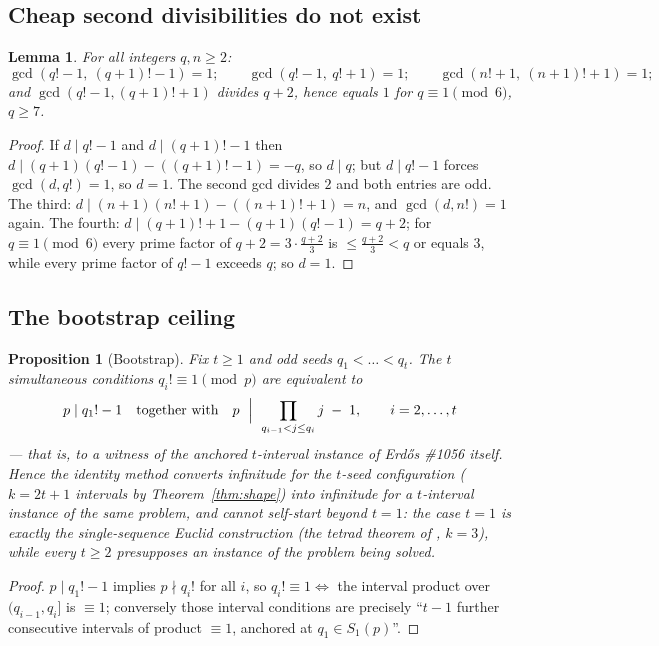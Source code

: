 \documentclass[11pt]{article}
\newtheorem{lemma}[theorem]{Lemma}
\newtheorem{proposition}[theorem]{Proposition}
\theoremstyle{definition}
\theoremstyle{remark}
\begin{document}
\subsection{Cheap second divisibilities do not exist}

\begin{lemma}\label{lem:gcds}
For all integers $q, n \ge 2$:
\[
  \gcd(q!-1,\ (q+1)!-1) = 1; \qquad
  \gcd(q!-1,\ q!+1) = 1; \qquad
  \gcd(n!+1,\ (n+1)!+1) = 1;
\]
and $\gcd(q!-1, (q+1)!+1)$ divides $q+2$, hence equals $1$ for
$q \equiv 1 \pmod 6$, $q \ge 7$.
\end{lemma}

\begin{proof}
If $d \mid q!-1$ and $d \mid (q+1)!-1$ then
$d \mid (q+1)(q!-1) - ((q+1)!-1) = -q$, so $d \mid q$; but $d \mid q!-1$
forces $\gcd(d, q!) = 1$, so $d = 1$. The second gcd divides $2$ and both entries
are odd. The third: $d \mid (n+1)(n!+1) - ((n+1)!+1) = n$, and
$\gcd(d, n!) = 1$ again. The fourth:
$d \mid (q+1)!+1 - (q+1)(q!-1) = q+2$; for $q \equiv 1 \pmod 6$ every prime
factor of $q+2 = 3 \cdot \frac{q+2}{3}$ is $\le \frac{q+2}{3} < q$ or equals
$3$, while every prime factor of $q!-1$ exceeds $q$; so $d = 1$.
\end{proof}

\subsection{The bootstrap ceiling}

\begin{proposition}[Bootstrap]\label{prop:bootstrap}
Fix $t \ge 1$ and odd seeds $q_1 < \dots < q_t$. The $t$ simultaneous
conditions $q_i! \equiv 1 \pmod p$ are equivalent to
\[
  p \mid q_1! - 1
  \quad\text{together with}\quad
  p \ \Bigm|\ \prod_{q_{i-1} < j \le q_i} j \; - \; 1, \qquad
  i = 2, \dots, t
\]
--- that is, to a witness of the \emph{anchored $t$-interval instance of
Erd\H{o}s \#1056 itself}. Hence the identity method converts infinitude for
the $t$-seed configuration ($k = 2t + 1$ intervals by
Theorem~\ref{thm:shape}) into infinitude for a $t$-interval instance of the
same problem, and cannot self-start beyond $t = 1$: the case $t = 1$ is
exactly the single-sequence Euclid construction (the tetrad theorem of
\cite{AAHS}, $k = 3$), while every $t \ge 2$ presupposes an instance of the
problem being solved.
\end{proposition}

\begin{proof}
$p \mid q_1! - 1$ implies $p \nmid q_i!$ for all $i$, so
$q_i! \equiv 1 \iff$ the interval product over $(q_{i-1}, q_i]$ is
$\equiv 1$; conversely those interval conditions are precisely ``$t-1$
further consecutive intervals of product $\equiv 1$, anchored at
$q_1 \in S_1(p)$''.
\end{proof}
\end{document}
